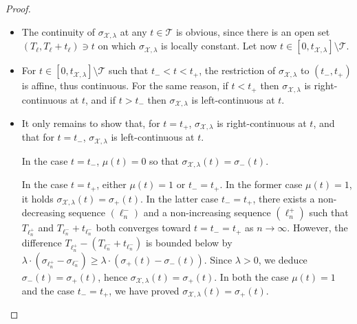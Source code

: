 \documentclass[11pt]{article}
\begin{document}
\begin{proof}
  \begin{itemize}
  \item The continuity of $\sigma_{\mathcal{X},\lambda}$ at any $t\in \mathcal{T}$ is obvious, since there is an open set $(T_\ell,T_\ell+t_\ell)\ni t$ on which $\sigma_{\mathcal{X},\lambda}$ is locally constant. Let now $t\in [0,t_{\mathcal{X},\lambda}]\setminus \mathcal{T}$.
  \item For $t\in [0,t_{\mathcal{X},\lambda} ]\setminus \mathcal{T}$ such that $t_-<t<t_+$, the restriction of $\sigma_{\mathcal{X},\lambda}$ to $(t_-,t_+)$ is affine, thus continuous. For the same reason, if $t<t_+$ then $\sigma_{\mathcal{X},\lambda}$ is right-continuous at $t$, and if $t>t_-$ then
  $\sigma_{\mathcal{X},\lambda}$ is left-continuous at $t$.
  \item It only remains to show that, for $t=t_+$, $\sigma_{\mathcal{X},\lambda}$ is right-continuous at $t$, and that  for $t=t_-$, $\sigma_{\mathcal{X},\lambda}$ is left-continuous at $t$.

  In the case $t=t_-$, $\mu(t)=0$ so that $\sigma_{\mathcal{X},\lambda}(t)=\sigma_-(t)$.

  In the case $t=t_+$, either $\mu(t)=1$  or $t_-=t_+$. In the former case $\mu(t)=1$, it holds $\sigma_{\mathcal{X},\lambda}(t)=\sigma_+(t)$.
  In the latter case $t_-=t_+$, there exists a non-decreasing sequence $(\ell^-_n)$ and a  non-increasing sequence $(\ell^+_n)$ such that $T_{\ell^+_n}$ and
  $T_{\ell^-_n}+t_{\ell_n^-}$  both converges toward $t=t_-=t_+$ as $n\to \infty$. However, the difference $T_{\ell^+_n}-(T_{\ell^-_n}+t_{\ell_n^-}) $ is bounded below by $\lambda\cdot (\sigma_{\ell^+_n}-\sigma_{\ell^-_n})\geq \lambda\cdot (\sigma_{+}(t)-\sigma_{-}(t))$. Since $\lambda>0$, we deduce $\sigma_-(t)=\sigma_+(t)$, hence $\sigma_{\mathcal{X},\lambda}(t)=\sigma_+(t)$.
  In both the case $\mu(t)=1$  and the case $t_-=t_+$, we have proved $\sigma_{\mathcal{X},\lambda}(t)=\sigma_+(t)$.


\end{itemize}
\end{proof}
\end{document}
